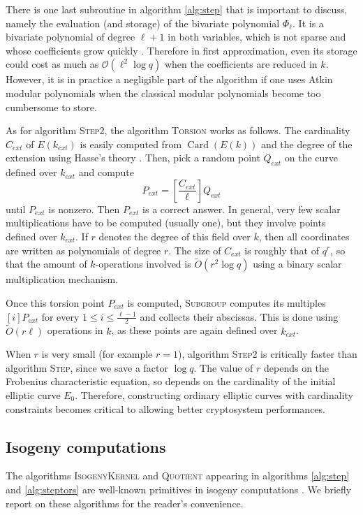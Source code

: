 \documentclass{article}
\renewcommand{\O}{\mathcal{O}}
\newcommand{\softO}{\tilde{O}}
\newcommand{\algstyle}[1]{\textsc{#1}}
\renewcommand{\v}{\vspace{5mm}}
\theoremstyle{definition}
\DeclareMathOperator{\Card}{Card}
\begin{document}
There is one last subroutine in algorithm \ref{alg:step} that is important to discuss,
namely the evaluation (and storage) of the bivariate polynomial $\Phi_\ell$. It is a bivariate
polynomial of degree $\ell + 1$ in both variables, which is not sparse and whose coefficients
grow quickly \cite{}. Therefore in first approximation, even its storage could cost as much as
$\O(\ell^2 \log q)$ when the coefficients are reduced in $k$. However, it is in practice a negligible
part of the algorithm if one uses Atkin modular polynomials
when the classical modular polynomials become too cumbersome to store.
\v

As for algorithm \algstyle{Step2}, the algorithm \algstyle{Torsion} works as follows.
The cardinality $C_{ext}$ of $E(k_{ext})$ is easily computed from $\Card(E(k))$
and the degree of the extension using Hasse's theory \cite{}.
Then, pick a random point $Q_{ext}$ on the curve defined over $k_{ext}$ and compute
\[
P_{ext} = \left[\frac{C_{ext}}{\ell}\right]Q_{ext}
\]
until $P_{ext}$ is nonzero. Then $P_{ext}$ is a correct answer.
In general, very few scalar multiplications have to be computed (usually one),
but they involve points defined over $k_{ext}$. If $r$ denotes the degree of
this field over $k$, then all coordinates are written as polynomials of degree
$r$. The size of $C_{ext}$ is roughly that of $q^r$, so that the amount of $k$-operations
 involved is $\softO(r^2\log q)$ using a binary scalar multiplication mechanism.

Once this torsion point $P_{ext}$ is computed, \algstyle{Subgroup} computes its
multiples $[i]P_{ext}$ for every $1\leq i\leq \frac{\ell - 1}{2}$ and collects
their abscissas. This is done using $\softO(r\ell)$ operations in $k$, as
these points are again defined over $k_{ext}$.

When $r$ is very small (for example $r = 1$), algorithm \algstyle{Step2} is
critically faster than algorithm \algstyle{Step}, since we save a factor $\log q$.
The value of $r$ depends on the Frobenius characteristic equation, so depends on
the cardinality of the initial elliptic curve $E_0$. Therefore, constructing
ordinary elliptic curves with cardinality constraints becomes critical to allowing
better cryptosystem performances.

\subsection{Isogeny computations}

The algorithms \algstyle{IsogenyKernel} and \algstyle{Quotient} appearing in
algorithms \ref{alg:step} and \ref{alg:steptors} are well-known primitives in isogeny
computations \cite{}. We briefly report on these algorithms
for the reader's convenience. 
\end{document}
